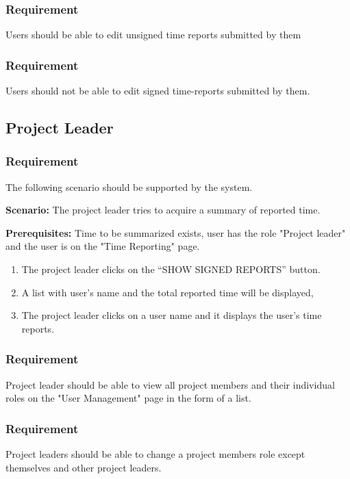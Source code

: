 \documentclass{article}
\begin{document}
\subsubsection{Requirement}
Users should be able to edit unsigned time reports submitted by them
\subsubsection{Requirement}
Users should not be able to edit signed time-reports submitted by them.



\subsection{Project Leader}
\subsubsection{Requirement}
The following scenario should be supported by the system.

\textbf{Scenario:} The project leader tries to acquire a summary of reported time.

\textbf{Prerequisites:} Time to be summarized exists, user has the role "Project leader" and the user is on the "Time Reporting" page.

\begin{enumerate}
    \item The project leader clicks on the “SHOW SIGNED REPORTS” button.
    \item A list with user’s name and the total reported time will be displayed,
    \item The project leader clicks on a user name and it displays the user’s time reports.
\end{enumerate}


\subsubsection{Requirement}
Project leader should be able to view all project members and their individual roles on the "User Management" page in the form of a list.

\subsubsection{Requirement}
Project leaders should be able to change a project members role except themselves and other project leaders.
\end{document}

